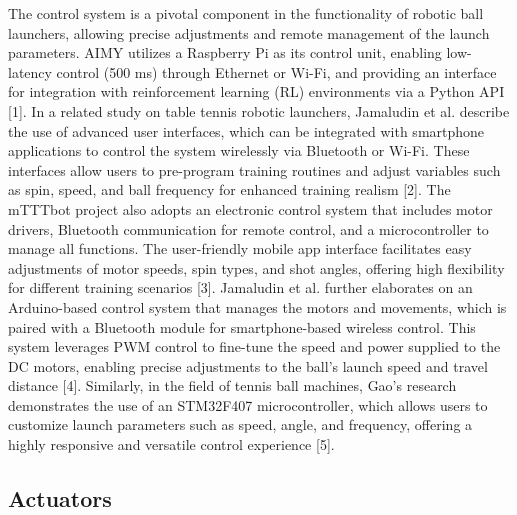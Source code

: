\documentclass[12pt]{article}
\begin{document}
The control system is a pivotal component in the functionality of robotic ball launchers, allowing precise adjustments and remote management of the launch parameters. AIMY utilizes a Raspberry Pi as its control unit, enabling low-latency control (500 ms) through Ethernet or Wi-Fi, and providing an interface for integration with reinforcement learning (RL) environments via a Python API [1]. In a related study on table tennis robotic launchers, Jamaludin et al. describe the use of advanced user interfaces, which can be integrated with smartphone applications to control the system wirelessly via Bluetooth or Wi-Fi. These interfaces allow users to pre-program training routines and adjust variables such as spin, speed, and ball frequency for enhanced training realism [2]. The mTTTbot project also adopts an electronic control system that includes motor drivers, Bluetooth communication for remote control, and a microcontroller to manage all functions. The user-friendly mobile app interface facilitates easy adjustments of motor speeds, spin types, and shot angles, offering high flexibility for different training scenarios [3]. Jamaludin et al. further elaborates on an Arduino-based control system that manages the motors and movements, which is paired with a Bluetooth module for smartphone-based wireless control. This system leverages PWM control to fine-tune the speed and power supplied to the DC motors, enabling precise adjustments to the ball’s launch speed and travel distance [4]. Similarly, in the field of tennis ball machines, Gao’s research demonstrates the use of an STM32F407 microcontroller, which allows users to customize launch parameters such as speed, angle, and frequency, offering a highly responsive and versatile control experience [5].

\subsection{Actuators}
\end{document}
